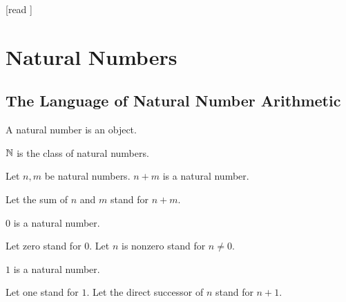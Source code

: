 \documentclass[10pt]{article}
\begin{document}
  \begin{imports}
    \begin{forthel}
      [read ]
    \end{forthel}
  \end{imports}


  \section*{Natural Numbers}

  \subsection*{The Language of Natural Number Arithmetic}

  \begin{forthel}
    \begin{signature}[id=ARITHMETIC_01_3074681254969344,printid]
      A natural number is an object.
    \end{signature}
  \end{forthel}

  \begin{forthel}
    \begin{definition}[id=ARITHMETIC_01_7367148418629632,printid]
      $\mathbb{N}$ is the class of natural numbers.
    \end{definition}
  \end{forthel}

  \begin{forthel}
    \begin{signature}[id=ARITHMETIC_01_1567933815848960,printid]
      Let $n, m$ be natural numbers.
      $n + m$ is a natural number.
    \end{signature}

    Let the sum of $n$ and $m$ stand for $n + m$.
  \end{forthel}

  \begin{forthel}
    \begin{signature}[id=ARITHMETIC_01_7633304715001856,printid]
      $0$ is a natural number.
    \end{signature}

    Let zero stand for $0$.
    Let $n$ is nonzero stand for $n \neq 0$.
  \end{forthel}

  \begin{forthel}
    \begin{signature}[id=ARITHMETIC_01_1200254566985232,printid]
      $1$ is a natural number.
    \end{signature}

    Let one stand for $1$.
    Let the direct successor of $n$ stand for $n + 1$.
  \end{forthel}
  
\end{document}
